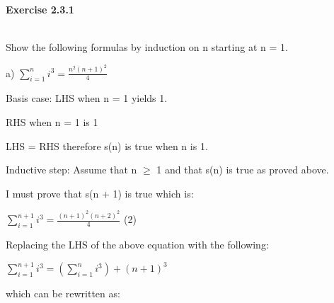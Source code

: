 \documentclass[12pt]{article}
\begin{document}
\begin{title}
    \centering
    {\LARGE\bfseries Exercise 2.3.1}
\end{title}\\

\vspace{10mm} %
Show the following formulas by induction on n starting at n = 1.

\vspace{5mm} %

a) $\sum_{i=1}^{n}i^3 = \frac{n^2(n+1)^2}{4}$\par

\vspace{5mm} %

Basis case: LHS when n = 1 yields 1.\par

\vspace{5mm} %

RHS when n = 1 is 1\par

LHS = RHS therefore s(n) is true when n is 1.\par

Inductive step: Assume that n $\geq$ 1 and that s(n) is true as proved above.\par I must prove that s(n + 1) is true which is:\par

\vspace{5mm} %

$\sum_{i=1}^{n+1}i^3 = \frac{(n+1)^2(n+2)^2}{4}$   \hfil\hfil\hfil (2)\par

\vspace{5mm} %

Replacing the LHS of the above equation with the following:\par

\vspace{5mm} %

$\sum_{i=1}^{n+1}i^3 = (\sum_{i=1}^{n}i^3) + (n + 1)^3$\par

\vspace{5mm} %

which can be rewritten as:\par

\vspace{5mm} %
\end{document}
